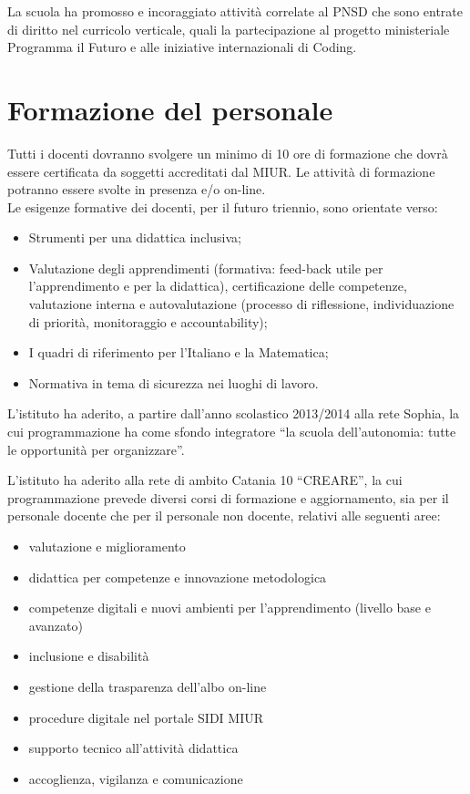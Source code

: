 \documentclass[12pt,a4paper,oneside]{memoir}
\begin{document}
La scuola ha promosso e incoraggiato attività correlate al PNSD che sono entrate di diritto nel curricolo verticale, quali la partecipazione al progetto ministeriale Programma il Futuro e alle iniziative internazionali di Coding.

\chapter[Formazione del personale]{Formazione del personale}

Tutti i docenti dovranno svolgere un minimo di 10 ore di formazione che dovrà essere certificata da soggetti accreditati dal MIUR. Le attività di formazione potranno essere svolte in presenza e/o on-line.\\
Le esigenze formative dei docenti, per il futuro triennio, sono orientate verso:

\begin{itemize}
\item Strumenti per una didattica inclusiva;
\item Valutazione degli apprendimenti (formativa: feed-back utile per l'apprendimento e per la didattica), certificazione delle competenze, valutazione interna e autovalutazione (processo di riflessione, individuazione di priorità, monitoraggio e accountability);
\item I quadri di riferimento per l'Italiano e la Matematica;
\item Normativa in tema di sicurezza nei luoghi di lavoro. 
\end{itemize}

L'istituto ha aderito, a partire dall'anno scolastico 2013/2014 alla rete Sophia, la cui programmazione ha come sfondo integratore ``la scuola dell'autonomia: tutte le opportunità per organizzare''.


L'istituto ha aderito alla rete di ambito Catania 10 ``CREARE'', la cui programmazione prevede diversi corsi di formazione e aggiornamento, sia per il personale docente che per il personale non docente, relativi alle seguenti aree:
\begin{itemize}
\item valutazione e miglioramento
\item didattica per competenze e innovazione metodologica
\item competenze digitali e nuovi ambienti per l'apprendimento (livello base e avanzato)
\item inclusione e disabilità
\item gestione della trasparenza dell'albo on-line
\item procedure digitale nel portale SIDI MIUR
\item supporto tecnico all'attività didattica
\item accoglienza, vigilanza e comunicazione
\end{itemize}
\end{document}

